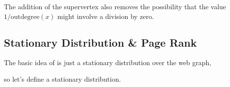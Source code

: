 \begin{example}
\bigskip\centerline{
  \hspace{2cm}
}\bigskip

The addition of the supervertex also removes the possibility that the value
$1/\text{outdegree}(x)$ might involve a division by zero.

\subsection{Stationary Distribution \& Page Rank}

The basic idea of  is just a stationary distribution over
the web graph,

so let's define a stationary distribution.


\end{example}
